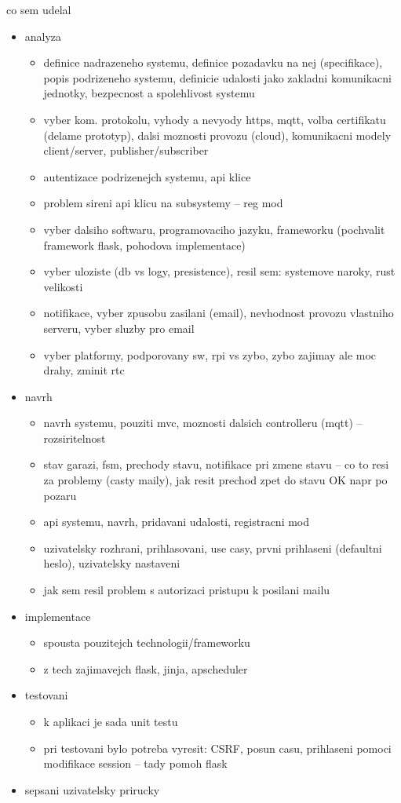 co sem udelal

\begin{itemize}
    \item analyza
    \begin{itemize}
    \item definice nadrazeneho systemu, definice pozadavku na nej (specifikace), popis podrizeneho systemu, definicie udalosti jako zakladni komunikacni jednotky, bezpecnost a spolehlivost systemu
    \item vyber kom. protokolu, vyhody a nevyody https, mqtt, volba certifikatu (delame prototyp), dalsi moznosti provozu (cloud), komunikacni modely client/server, publisher/subscriber
    \item autentizace podrizenejch systemu, api klice
    \item problem sireni api klicu na subsystemy -- reg mod
    \item vyber dalsiho softwaru, programovaciho jazyku, frameworku (pochvalit framework flask, pohodova implementace)
    \item vyber uloziste (db vs logy, presistence), resil sem: systemove naroky, rust velikosti
    \item notifikace, vyber zpusobu zasilani (email), nevhodnost provozu vlastniho serveru, vyber sluzby pro email
    \item vyber platformy, podporovany sw, rpi vs zybo, zybo zajimay ale moc drahy, zminit rtc
    \end{itemize}
    \item navrh
    \begin{itemize}
        \item navrh systemu, pouziti mvc, moznosti dalsich controlleru (mqtt) -- rozsiritelnost
        \item stav garazi, fsm, prechody stavu, notifikace pri zmene stavu -- co to resi za problemy (casty maily), jak resit prechod zpet do stavu OK napr po pozaru
        \item api systemu, navrh, pridavani udalosti, registracni mod
        \item uzivatelsky rozhrani, prihlasovani, use casy, prvni prihlaseni (defaultni heslo), uzivatelsky nastaveni
        \item jak sem resil problem s autorizaci pristupu k posilani mailu
    \end{itemize}
    \item implementace
    \begin{itemize}
        \item spousta pouzitejch technologii/frameworku
        \item z tech zajimavejch flask, jinja, apscheduler
    \end{itemize}
    \item testovani
    \begin{itemize}
        \item k aplikaci je sada unit testu
        \item pri testovani bylo potreba vyresit: CSRF, posun casu, prihlaseni pomoci modifikace session -- tady pomoh flask
    \end{itemize}
    \item sepsani uzivatelsky prirucky
\end{itemize}